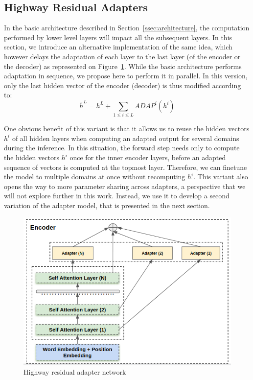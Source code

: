 \documentclass[11pt,a4paper]{article}
\begin{document}
\subsection{Highway Residual Adapters \label{ssec:highway}}

In the basic architecture described in Section~\ref{ssec:architecture}, the computation performed by lower level layers will impact all the subsequent layers. In this section, we introduce an alternative implementation of the same idea, which however delays the adaptation of each layer to the last layer (of the encoder or the decoder) as represented on Figure~\ref{fig:hrl-architecture}. While the basic architecture performs adaptation in sequence, we propose here to perform it in parallel. In this version, only the last hidden vector of the encoder (decoder) is thus modified according to:
\begin{equation}
  \bar{h}^L = h^L + \displaystyle{\mathop{\sum}_{1 \leq i \leq L} ADAP^i(h^i)} \label{eq:highway-output}
\end{equation}

One obvious benefit of this variant is that it allows us to reuse the hidden vectors $h^i$ of all hidden layers when computing an adapted output for several domains during the inference. In this situation, the forward step needs only to compute the hidden vectors $h^i$ once for the inner encoder layers, before an adapted sequence of vectors is computed at the topmost layer. Therefore, we can finetune the model to multiple domains at once without recomputing $h^i$. This variant also opens the way to more parameter sharing across adapters, a perspective that we will not explore further in this work. Instead, we use it to develop a second variation of the adapter model, that is presented in the next section.

\begin{figure}[htbp]
  \centering
  \includegraphics[scale=0.3]{fig/highway_residual}
  \caption{Highway residual adapter network}
  \label{fig:hrl-architecture}
\end{figure}
\end{document}
